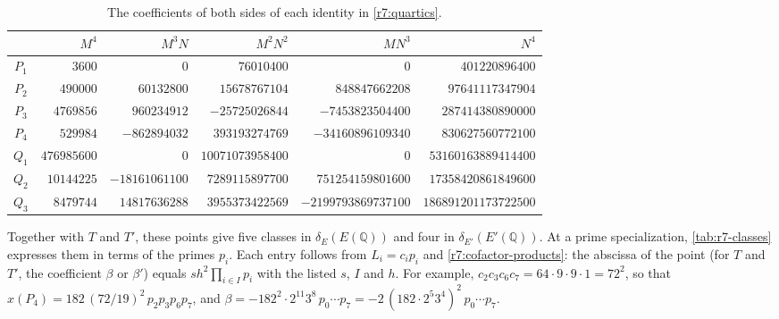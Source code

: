 \documentclass[12pt,oneside,openany]{book}
\theoremstyle{definition}
\theoremstyle{plain}
\numberwithin{equation}{chapter}
\theoremstyle{plain}
\theoremstyle{definition}
\theoremstyle{remark}
\newcommand{\Q}{\mathbb Q}
\begin{document}
\begin{table}[htbp]
\centering
\caption{The coefficients of both sides of each identity in
\eqref{r7:quartics}.}
\label{tab:r7-coeff}
\footnotesize
\setlength{\tabcolsep}{4pt}
\begin{tabular}{crrrrr}
\toprule
 & $M^4$ & $M^3N$ & $M^2N^2$ & $MN^3$ & $N^4$\\
\midrule
$P_1$ & $3600$ & $0$ & $76010400$ & $0$ & $401220896400$\\
$P_2$ & $490000$ & $60132800$ & $15678767104$ & $848847662208$ & $97641117347904$\\
$P_3$ & $4769856$ & $960234912$ & $-25725026844$ & $-7453823504400$ & $287414380890000$\\
$P_4$ & $529984$ & $-862894032$ & $393193274769$ & $-34160896109340$ & $830627560772100$\\
$Q_1$ & $476985600$ & $0$ & $10071073958400$ & $0$ & $53160163889414400$\\
$Q_2$ & $10144225$ & $-18161061100$ & $7289115897700$ & $751254159801600$ & $17358420861849600$\\
$Q_3$ & $8479744$ & $14817636288$ & $3955373422569$ & $-2199793869737100$ & $186891201173722500$\\
\bottomrule
\end{tabular}
\end{table}

Together with $T$ and $T'$, these points give five classes in
$\delta_E(E(\Q))$ and four in $\delta_{E'}(E'(\Q))$. At a prime
specialization, \cref{tab:r7-classes} expresses them in terms of the primes
$p_i$. Each entry follows from $L_i=c_ip_i$ and
\eqref{r7:cofactor-products}: the abscissa of the point (for $T$ and $T'$,
the coefficient $\beta$ or $\beta'$) equals $sh^2\prod_{i\in I}p_i$ with the listed $s$, $I$ and $h$. For example,
$c_2c_3c_6c_7=64\cdot9\cdot9\cdot1=72^2$, so that
$x(P_4)=182\,(72/19)^2\,p_2p_3p_6p_7$, and
$\beta=-182^2\cdot2^{11}3^8\,p_0\cdots p_7=-2\,(182\cdot2^5 3^4)^2\,p_0\cdots p_7$.
\end{document}
